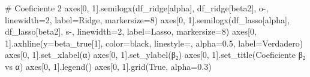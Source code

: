 \documentclass[
  doc,
  floatsintext,
  longtable,
  a4paper,
  nolmodern,
  notxfonts,
  notimes,
  12pt,
  colorlinks=true,linkcolor=blue,citecolor=blue,urlcolor=blue]{apa7}
\newenvironment{Shaded}{\begin{snugshade}}{\end{snugshade}}
\newcommand{\CommentTok}[1]{\textcolor[rgb]{0.37,0.37,0.37}{#1}}
\newcommand{\DecValTok}[1]{\textcolor[rgb]{0.68,0.00,0.00}{#1}}
\newcommand{\FloatTok}[1]{\textcolor[rgb]{0.68,0.00,0.00}{#1}}
\newcommand{\NormalTok}[1]{\textcolor[rgb]{0.00,0.23,0.31}{#1}}
\newcommand{\OperatorTok}[1]{\textcolor[rgb]{0.37,0.37,0.37}{#1}}
\newcommand{\StringTok}[1]{\textcolor[rgb]{0.13,0.47,0.30}{#1}}
\newcommand{\VariableTok}[1]{\textcolor[rgb]{0.07,0.07,0.07}{#1}}
\begin{document}
\begin{Shaded}
\begin{Highlighting}[]
\CommentTok{\# Coeficiente 2}
\NormalTok{axes[}\DecValTok{0}\NormalTok{, }\DecValTok{1}\NormalTok{].semilogx(df\_ridge[}\StringTok{\textquotesingle{}alpha\textquotesingle{}}\NormalTok{], df\_ridge[}\StringTok{\textquotesingle{}beta2\textquotesingle{}}\NormalTok{], }
                    \StringTok{\textquotesingle{}o{-}\textquotesingle{}}\NormalTok{, linewidth}\OperatorTok{=}\DecValTok{2}\NormalTok{, label}\OperatorTok{=}\StringTok{\textquotesingle{}Ridge\textquotesingle{}}\NormalTok{, markersize}\OperatorTok{=}\DecValTok{8}\NormalTok{)}
\NormalTok{axes[}\DecValTok{0}\NormalTok{, }\DecValTok{1}\NormalTok{].semilogx(df\_lasso[}\StringTok{\textquotesingle{}alpha\textquotesingle{}}\NormalTok{], df\_lasso[}\StringTok{\textquotesingle{}beta2\textquotesingle{}}\NormalTok{], }
                    \StringTok{\textquotesingle{}s{-}\textquotesingle{}}\NormalTok{, linewidth}\OperatorTok{=}\DecValTok{2}\NormalTok{, label}\OperatorTok{=}\StringTok{\textquotesingle{}Lasso\textquotesingle{}}\NormalTok{, markersize}\OperatorTok{=}\DecValTok{8}\NormalTok{)}
\NormalTok{axes[}\DecValTok{0}\NormalTok{, }\DecValTok{1}\NormalTok{].axhline(y}\OperatorTok{=}\NormalTok{beta\_true[}\DecValTok{1}\NormalTok{], color}\OperatorTok{=}\StringTok{\textquotesingle{}black\textquotesingle{}}\NormalTok{, linestyle}\OperatorTok{=}\StringTok{\textquotesingle{}{-}{-}\textquotesingle{}}\NormalTok{, }
\NormalTok{                   alpha}\OperatorTok{=}\FloatTok{0.5}\NormalTok{, label}\OperatorTok{=}\StringTok{\textquotesingle{}Verdadero\textquotesingle{}}\NormalTok{)}
\NormalTok{axes[}\DecValTok{0}\NormalTok{, }\DecValTok{1}\NormalTok{].set\_xlabel(}\StringTok{\textquotesingle{}α\textquotesingle{}}\NormalTok{)}
\NormalTok{axes[}\DecValTok{0}\NormalTok{, }\DecValTok{1}\NormalTok{].set\_ylabel(}\StringTok{\textquotesingle{}β₂\textquotesingle{}}\NormalTok{)}
\NormalTok{axes[}\DecValTok{0}\NormalTok{, }\DecValTok{1}\NormalTok{].set\_title(}\StringTok{\textquotesingle{}Coeficiente β₂ vs α\textquotesingle{}}\NormalTok{)}
\NormalTok{axes[}\DecValTok{0}\NormalTok{, }\DecValTok{1}\NormalTok{].legend()}
\NormalTok{axes[}\DecValTok{0}\NormalTok{, }\DecValTok{1}\NormalTok{].grid(}\VariableTok{True}\NormalTok{, alpha}\OperatorTok{=}\FloatTok{0.3}\NormalTok{)}


\end{Highlighting}
\end{Shaded}
\end{document}
